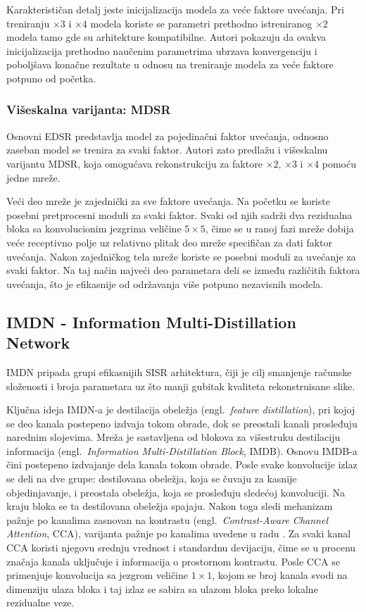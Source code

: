 \documentclass[12pt,a4paper]{article}
\begin{document}
Karakterističan detalj jeste inicijalizacija modela za veće faktore uvećanja. Pri treniranju $\times3$ i $\times4$ modela koriste se parametri prethodno istreniranog $\times2$ modela tamo gde su arhitekture kompatibilne. Autori pokazuju da ovakva inicijalizacija prethodno naučenim parametrima ubrzava konvergenciju i poboljšava konačne rezultate u odnosu na treniranje modela za veće faktore potpuno od početka.

\subsubsection{Višeskalna varijanta: MDSR}
\label{sec:mdsr}

Osnovni EDSR predstavlja model za pojedinačni faktor uvećanja, odnosno zaseban model se trenira za svaki faktor. Autori zato predlažu i višeskalnu varijantu MDSR, koja omogućava rekonstrukciju za faktore $\times2$, $\times3$ i $\times4$ pomoću jedne mreže.

Veći deo mreže je zajednički za sve faktore uvećanja. Na početku se koriste posebni pretprocesni moduli za svaki faktor. Svaki od njih sadrži dva rezidualna bloka sa konvolucionim jezgrima veličine $5\times5$, čime se u ranoj fazi mreže dobija veće receptivno polje uz relativno plitak deo mreže specifičan za dati faktor uvećanja. Nakon zajedničkog tela mreže koriste se posebni moduli za uvećanje za svaki faktor. Na taj način najveći deo parametara deli se između različitih faktora uvećanja, što je efikasnije od održavanja više potpuno nezavisnih modela.


\subsection{IMDN - Information Multi-Distillation Network}

IMDN \cite{IMDN} pripada grupi efikasnijih SISR arhitektura, čiji je cilj smanjenje računske složenosti i broja parametara uz što manji gubitak kvaliteta rekonstruisane slike.

Ključna ideja IMDN-a je destilacija obeležja (engl.\ \textit{feature distillation}), pri kojoj se deo kanala postepeno izdvaja tokom obrade, dok se preostali kanali prosleđuju narednim slojevima. Mreža je sastavljena od blokova za višestruku destilaciju informacija (engl.\ \textit{Information Multi-Distillation Block}, IMDB). Osnovu IMDB-a čini postepeno izdvajanje dela kanala tokom obrade. Posle svake konvolucije izlaz se deli na dve grupe: destilovana obeležja, koja se čuvaju za kasnije objedinjavanje, i preostala obeležja, koja se prosleđuju sledećoj konvoluciji. Na kraju bloka se ta destilovana obeležja spajaju.  Nakon toga sledi mehanizam pažnje po kanalima zasnovan na kontrastu (engl.\ \textit{Contrast-Aware Channel Attention}, CCA), varijanta pažnje po kanalima uvedene u radu \cite{SENet}. Za svaki kanal CCA koristi njegovu srednju vrednost i standardnu devijaciju, čime se u
procenu značaja kanala uključuje i informacija o prostornom kontrastu. Posle CCA se primenjuje konvolucija sa jezgrom veličine $1\times1$, kojom se broj kanala svodi na dimenziju ulaza bloka i taj izlaz se sabira sa ulazom bloka preko lokalne rezidualne veze.
\end{document}
